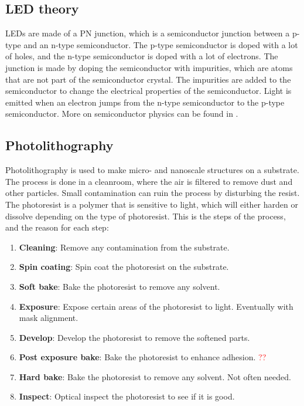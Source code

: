 
\subsection{LED theory}
\label{LEDtheory}
LEDs are made of a PN junction, which is a semiconductor junction between a p-type and an n-type semiconductor.
The p-type semiconductor is doped with a lot of holes, and the n-type semiconductor is doped with a lot of electrons.
The junction is made by doping the semiconductor with impurities, which are atoms that are not part of the semiconductor crystal.
The impurities are added to the semiconductor to change the electrical properties of the semiconductor.
Light is emitted when an electron jumps from the n-type semiconductor to the p-type semiconductor.
More on semiconductor physics can be found in \cite{streetman2015solid}.


\subsection{Photolithography}
\label{photolithography}

Photolithography is used to make micro- and nanoscale structures on a substrate.
The process is done in a cleanroom, where the air is filtered to remove dust and other particles.
Small contamination can ruin the process by disturbing the resist.
The photoresist is a polymer that is sensitive to light, which will either harden or dissolve depending on the type of photoresist.
This is the steps of the process, and the reason for each step:


\begin{enumerate}
    \item \textbf{Cleaning}: Remove any contamination from the substrate.
    \item \textbf{Spin coating}: Spin coat the photoresist on the substrate.
    \item \textbf{Soft bake}: Bake the photoresist to remove any solvent.
    \item \textbf{Exposure}: Expose certain areas of the photoresist to light. Eventually with mask alignment.
    \item \textbf{Develop}: Develop the photoresist to remove the softened parts.
    \item \textbf{Post exposure bake}: Bake the photoresist to enhance adhesion. \textcolor{red}{??}
    \item \textbf{Hard bake}: Bake the photoresist to remove any solvent. Not often needed.
    \item \textbf{Inspect}: Optical inspect the photoresist to see if it is good.
\end{enumerate}

